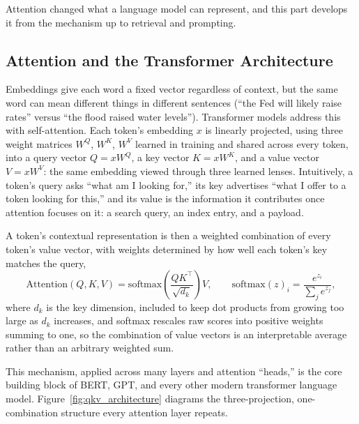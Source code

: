 \documentclass[../ai_in_finance]{subfiles}
\begin{document}
Attention changed what a language model can represent, and this part develops it from the mechanism up to retrieval and prompting.

\subsection{Attention and the Transformer Architecture}
\label{sec:attention-transformers}

Embeddings give each word a fixed vector regardless of context, but the same word can mean different things in different sentences (``the Fed will likely raise rates'' versus ``the flood raised water levels''). Transformer models address this with self-attention. Each token's embedding $x$ is linearly projected, using three weight matrices $W^Q$, $W^K$, $W^V$ learned in training and shared across every token, into a query vector $Q=xW^Q$, a key vector $K=xW^K$, and a value vector $V=xW^V$: the same embedding viewed through three learned lenses. Intuitively, a token's query asks ``what am I looking for,'' its key advertises ``what I offer to a token looking for this,'' and its value is the information it contributes once attention focuses on it: a search query, an index entry, and a payload.

A token's contextual representation is then a weighted combination of every token's value vector, with weights determined by how well each token's key matches the query,
\begin{equation}
\text{Attention}(Q,K,V) = \text{softmax}\!\left(\frac{QK^\top}{\sqrt{d_k}}\right) V, \qquad \text{softmax}(z)_i = \frac{e^{z_i}}{\sum_j e^{z_j}},
\label{eq:nlp-attention}
\end{equation}
where $d_k$ is the key dimension, included to keep dot products from growing too large as $d_k$ increases, and softmax rescales raw scores into positive weights summing to one, so the combination of value vectors is an interpretable average rather than an arbitrary weighted sum.

This mechanism, applied across many layers and attention ``heads,'' is the core building block of BERT, GPT, and every other modern transformer language model. Figure~\ref{fig:qkv_architecture} diagrams the three-projection, one-combination structure every attention layer repeats.
\end{document}
